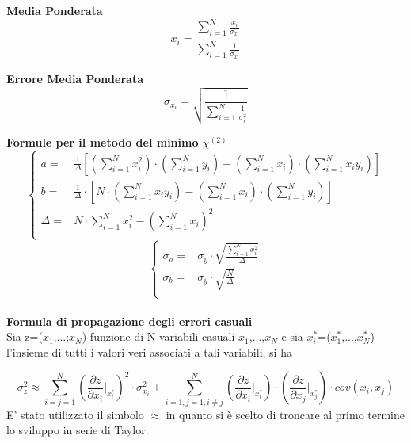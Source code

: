 \documentclass[a4paper,11pt,oneside]{article}
\begin{document}
\textbf{Media Ponderata}
\begin{equation*}
\label{eq:media_pond}
    x_i=\frac{\sum_{i=1}^{N}\frac{x_i}{\sigma_{x_i}}}{\sum_{i=1}^{N}\frac{1}{\sigma_{x_i}}}
\end{equation*}

\textbf{Errore Media Ponderata}
\begin{equation*}
\label{eq:errore_media_pond}
     \sigma_{x_i}=\sqrt{\frac{1}{\sum_{i=1}^{N}\frac{1}{\sigma_{i}^{2}}}}
\end{equation*}

\textbf{Formule per il metodo del minimo ${\chi}^{(2)}$}
\begin{equation*}
        \begin{cases}
    a=&\frac{1}{\Delta}[(\sum\limits_{i=1}^{N}{x_{i}^{2}})\cdot(\sum\limits_{i=1}^{N}{y_{i}})-(\sum\limits_{i=1}^{N}{x_{i}})\cdot(\sum\limits_{i=1}^{N}{x_{i}y_{i}})] \\ 
    b=&\frac{1}{\Delta }\cdot \left [N\cdot \left ( \sum\limits_{i=1}^{N}x_i y_i \right )-\left ( \sum\limits_{i=1}^{N}x_i \right )\cdot \left ( \sum\limits_{i=1}^{N}y_i \right )  \right ]\\
    \Delta=& N\cdot \sum\limits_{i=1}^{N} x_i^{2} - \left ( \sum\limits_{i=1}^{N}x_i \right )^{2}\\
    \end{cases}
\end{equation*}
\begin{equation*}
    \begin{cases}
    \sigma_{a}=&\sigma_{y}\cdot\sqrt{\frac{\sum_{i=1}^{N}{x_{i}^{2}}}{\Delta}} \\
    \sigma_{b}=&\sigma_y\cdot \sqrt{\frac{N}{\Delta }}\\
    \end{cases}
    \label{equation:err_chi_quadro}
\end{equation*}
\\
\newline
\textbf{Formula di propagazione degli errori casuali}\\

Sia z=($x_1$,...;$x_N$) funzione di N variabili casuali $x_1$,...,$x_N$ e sia ${x_i^\ast}$=($x_1^\ast$,...,$x_N^{\ast}$) l'insieme di tutti i valori veri associati a tali variabili, si ha 

\begin{equation*}
    \sigma_z^{2}\approx  \sum_{i=j=1}^{N}\left ( \frac{\partial z}{\partial x_i}\Big|_{x_i^{\ast}} \right )^{2}\cdot\sigma_{x_i}^{2} +\sum_{i=1,j=1,i\neq j}^{N}\left (\frac{\partial z }{\partial x_i}\Big|_{x_i^{\ast}} \right ) \cdot \left ( \frac{\partial z}{\partial x_j} \Big|_{x_j^{\ast}} \right )\cdot cov(x_i,x_j)\label{eq:prop_errori}
\end{equation*}
E' stato utilizzato il simbolo $\approx$ in quanto si è scelto di troncare al primo termine lo sviluppo in serie di Taylor.\\
\end{document}
